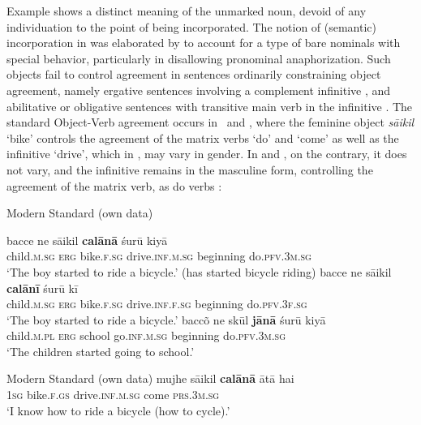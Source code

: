 \documentclass[output=paper]{LSP/langsci}
\begin{document}
Example  shows a distinct meaning of the unmarked noun, devoid of any individuation to the point of being incorporated. The notion of (semantic) incorporation in  was elaborated by \citet{Dayal2011Hindi} to account for a type of bare nominals with special behavior, particularly in disallowing pronominal anaphorization. Such objects fail to control agreement in sentences ordinarily constraining object agreement, namely ergative sentences involving a complement infinitive , and abilitative or obligative sentences with transitive main verb in the infinitive . The standard Object-Verb agreement occurs in~ and , where the feminine object \textit{sāikil} ‘bike’ controls the agreement of the matrix verbs ‘do’ and ‘come’ as well as the infinitive ‘drive’, which in , may vary in gender. In  and , on the contrary, it does not vary, and the infinitive remains in the masculine form, controlling the agreement of the matrix verb, as do  verbs :

\ea Modern Standard   (own data)
\label{10-mo-ex:25}

\ea \label{10-mo-ex:25a}
\gll bacce ne sāikil \textbf{calānā} śurū kiyā\\
 child.\textsc{m.sg} \textsc{erg} bike.\textsc{f.sg} drive.\textsc{inf.m.sg} beginning do.\textsc{pfv.3m.sg}\\
\glt ‘The boy started to ride a bicycle.’ (has started bicycle riding)
\ex \label{10-mo-ex:25b} 
\gll bacce ne sāikil \textbf{calānī} śurū kī\\
 child.\textsc{m.sg} \textsc{erg} bike.\textsc{f.sg} drive.\textsc{inf.f.sg} beginning do.\textsc{pfv.3f.sg}\\
\glt ‘The boy started to ride a bicycle.’
\ex \label{10-mo-ex:25c}
\gll baccõ ne skūl \textbf{jānā} śurū kiyā\\
 child.\textsc{m.pl} \textsc{erg} school go.\textsc{inf.m.sg} beginning do.\textsc{pfv.3m.sg}\\
\glt ‘The children started going to school.’
\z
\z

\ea Modern Standard   (own data)
\label{10-mo-ex:26}
\ea \label{10-mo-ex:26a}
\gll mujhe sāikil \textbf{calānā} ātā hai\\
\textsc{1sg} bike.\textsc{f.gs} drive.\textsc{inf.m.sg} come \textsc{prs.3m.sg}\\
\glt ‘I know how to ride a bicycle (how to cycle).’
\end{document}
